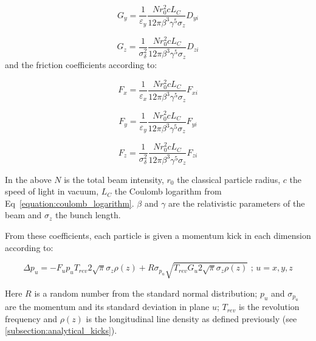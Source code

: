 \begin{equation}
    \boxed{G_y = \frac{1}{\varepsilon_y} \frac{N r_0^2 c L_C}{12 \pi \beta^3 \gamma^5 \sigma_z} D_{yi}}
    \label{equation:kinetic_vertical_diffusion_coefficient}
\end{equation}

\begin{equation}
    \boxed{G_z = \frac{1}{\sigma_{\delta}^2} \frac{N r_0^2 c L_C}{12 \pi \beta^3 \gamma^5 \sigma_z} D_{zi}}
    \label{equation:kinetic_longitudinal_diffusion_coefficient}
\end{equation}
and the friction coefficients according to:

\begin{equation}
    \boxed{F_x = \frac{1}{\varepsilon_x} \frac{N r_0^2 c L_C}{12 \pi \beta^3 \gamma^5 \sigma_z} F_{xi}}
    \label{equation:kinetic_horizontal_friction_coefficient}
\end{equation}

\begin{equation}
    \boxed{F_y = \frac{1}{\varepsilon_y} \frac{N r_0^2 c L_C}{12 \pi \beta^3 \gamma^5 \sigma_z} F_{yi}}
    \label{equation:kinetic_vertical_friction_coefficient}
\end{equation}

\begin{equation}
    \boxed{F_z = \frac{1}{\sigma_{\delta}^2} \frac{N r_0^2 c L_C}{12 \pi \beta^3 \gamma^5 \sigma_z} F_{zi}}
    \label{equation:kinetic_longitudinal_friction_coefficient}
\end{equation}

In the above \(N\) is the total beam intensity, \(r_0\) the classical particle radius, \(c\) the speed of light in vacuum, \(L_C\) the Coulomb logarithm from Eq~\eqref{equation:coulomb_logarithm}.
\(\beta\) and \(\gamma\) are the relativistic parameters of the beam and \(\sigma_z\) the bunch length.
\newline

From these coefficients, each particle is given a momentum kick in each dimension according to:

\begin{equation}
    \boxed{\Delta p_u = - F_u p_u T_{rev} 2 \sqrt{\pi} \sigma_z \rho(z) + R \sigma_{p_u} \sqrt{T_{rev} G_u 2 \sqrt{\pi} \sigma_z \rho(z)} \text{ ;   } u=x,y,z}
    \label{equation:momentum_kick_kinetic}
\end{equation}

Here \(R\) is a random number from the standard normal distribution; \(p_u\) and \(\sigma_{p_u}\) are the momentum and its standard deviation in plane \(u\); \(T_{rev}\) is the revolution frequency and \(\rho(z)\) is the longitudinal line density as defined previously (see \ref{subsection:analytical_kicks}).



